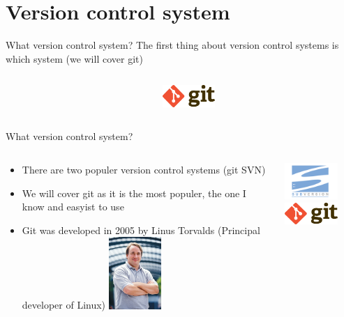 \documentclass[10pt]{beamer}
\begin{document}
\section{Version control system}


\begin{frame}[fragile]{What version control system?}
The first thing about version control systems is which system (we will cover git) \\
  \begin{columns}[T]
    \begin{column}{.8\textwidth}
    \end{column}
    \begin{column}{.2\textwidth}
	\includegraphics[width=2cm]{Figs/Git-logo}
    \end{column}
  \end{columns}
\end{frame}


\begin{frame}[fragile]{What version control system?}
  \begin{columns}[T]
    \begin{column}{.8\textwidth}
	\begin{itemize}
		\item There are two populer version control systems (git  SVN)
		\item We will cover git as it is the most populer, the one I know and easyist to use
		\item Git was developed in 2005 by Linus Torvalds (Principal developer of Linux)
  		\includegraphics[width=2cm]{Figs/Linus_Torvalds}
	\end{itemize}
    \end{column}
    \begin{column}{.2\textwidth}
	\includegraphics[width=2cm]{Figs/SVN} \newline \newline
	\includegraphics[width=2cm]{Figs/Git-logo}
    \end{column}
  \end{columns}
\end{frame}
\end{document}
